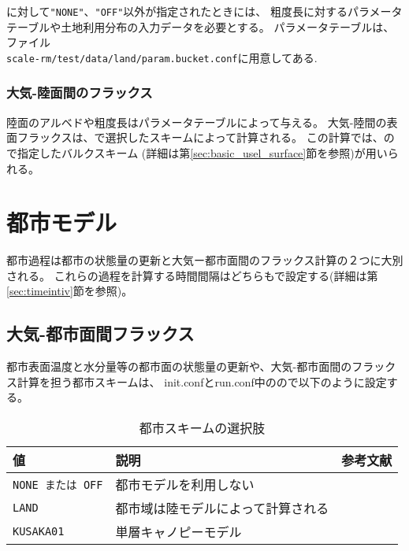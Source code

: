 に対して\verb|"NONE"|、\verb|"OFF"|以外が指定されたときには、
粗度長に対するパラメータテーブルや土地利用分布の入力データを必要とする。
パラメータテーブルは、ファイル\\
\verb|scale-rm/test/data/land/param.bucket.conf|に用意してある.\\


\subsubsection{大気-陸面間のフラックス}
陸面のアルベドや粗度長はパラメータテーブルによって与える。
大気-陸間の表面フラックスは、で選択したスキームによって計算される。
この計算では、ので指定したバルクスキーム
(詳細は第\ref{sec:basic_usel_surface}節を参照)が用いられる。


\section{都市モデル} \label{sec:basic_usel_urban}
都市過程は都市の状態量の更新と大気ー都市面間のフラックス計算の２つに大別される。
これらの過程を計算する時間間隔はどちらもで設定する(詳細は第\ref{sec:timeintiv}節を参照)。

\subsection{大気-都市面間フラックス}
都市表面温度と水分量等の都市面の状態量の更新や、大気-都市面間のフラックス計算を担う都市スキームは、
init.confとrun.conf中のので以下のように設定する。


\begin{table}[h]
\begin{center}
  \caption{都市スキームの選択肢}
  \label{tab:nml_urban}
  \begin{tabularx}{150mm}{llX} \hline
    \rowcolor[gray]{0.9}  値  & 説明 &  参考文献 \\ \hline
      \verb|NONE または OFF|   & 都市モデルを利用しない                      \\
      \verb|LAND|             & 都市域は陸モデルによって計算される            \\
      \verb|KUSAKA01|         & 単層キャノピーモデル  & \citet{kusaka_2001} \\
    \hline
  \end{tabularx}
\end{center}
\end{table}

